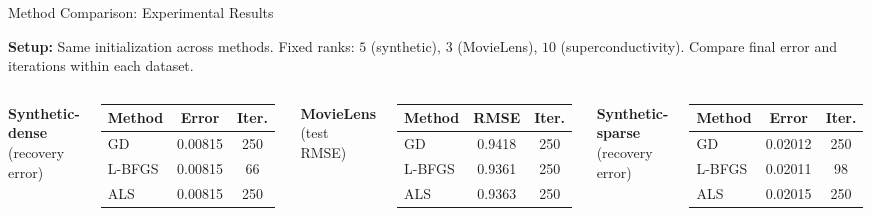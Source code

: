 \documentclass[aspectratio=169,usenames,dvipsnames]{beamer}
\begin{document}
\begin{frame}{Method Comparison: Experimental Results}

\small
\textbf{Setup:} Same initialization across methods. Fixed ranks: $5$ (synthetic), $3$ (MovieLens), $10$ (superconductivity). Compare final error and iterations within each dataset.

\vspace{0.12cm}
\centering
\setlength{\tabcolsep}{3.5pt}
\renewcommand{\arraystretch}{1.05}

\begin{columns}[T,onlytextwidth]
\centering
{\scriptsize \textbf{Synthetic-dense} (recovery error)}

\vspace{0.03cm}
\scriptsize
\begin{tabular}{lcc}
\toprule
\textbf{Method} & \textbf{Error} & \textbf{Iter.} \\
\midrule
GD & 0.00815 & 250 \\
L-BFGS & 0.00815 & 66 \\
ALS & 0.00815 & 250 \\
\bottomrule
\end{tabular}

\vspace{0.16cm}
{\scriptsize \textbf{MovieLens} (test RMSE)}

\vspace{0.03cm}
\scriptsize
\begin{tabular}{lcc}
\toprule
\textbf{Method} & \textbf{RMSE} & \textbf{Iter.} \\
\midrule
GD & 0.9418 & 250 \\
L-BFGS & 0.9361 & 250 \\
ALS & 0.9363 & 250 \\
\bottomrule
\end{tabular}

\centering
{\scriptsize \textbf{Synthetic-sparse} (recovery error)}

\vspace{0.03cm}
\scriptsize
\begin{tabular}{lcc}
\toprule
\textbf{Method} & \textbf{Error} & \textbf{Iter.} \\
\midrule
GD & 0.02012 & 250 \\
L-BFGS & 0.02011 & 98 \\
ALS & 0.02015 & 250 \\
\bottomrule
\end{tabular}


\end{columns}
\end{frame}
\end{document}
